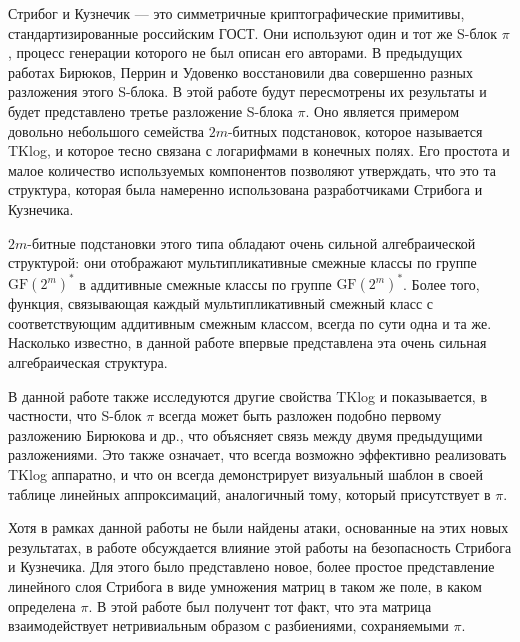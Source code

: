 \abstract

Стрибог и Кузнечик — это симметричные криптографические примитивы, стандартизированные российским ГОСТ. Они используют один и тот же S-блок \(\pi\), процесс генерации которого не был описан его авторами. В предыдущих работах Бирюков, Перрин и Удовенко восстановили два совершенно разных разложения этого S-блока. В этой работе будут пересмотрены их результаты и будет представлено третье разложение S-блока \(\pi\). Оно является примером довольно небольшого семейства \(2m\)-битных подстановок, которое называется TKlog, и которое тесно связана с логарифмами в конечных полях. Его простота и малое количество используемых компонентов позволяют утверждать, что это та структура, которая была намеренно использована разработчиками Стрибога и Кузнечика.

\(2m\)-битные подстановки этого типа обладают очень сильной алгебраической структурой: они отображают мультипликативные смежные классы по группе \(\text{GF}(2^m)^*\) в аддитивные смежные классы по группе \(\text{GF}(2^m)^*\). Более того, функция, связывающая каждый мультипликативный смежный класс с соответствующим аддитивным смежным классом, всегда по сути одна и та же. Насколько известно, в данной работе впервые представлена эта очень сильная алгебраическая структура.

В данной работе также исследуются другие свойства TKlog и показывается, в частности, что S-блок \(\pi\) всегда может быть разложен подобно первому разложению Бирюкова и др., что объясняет связь между двумя предыдущими разложениями. Это также означает, что всегда возможно эффективно реализовать TKlog аппаратно, и что он всегда демонстрирует визуальный шаблон в своей таблице линейных аппроксимаций, аналогичный тому, который присутствует в \(\pi\).

Хотя в рамках данной работы не были найдены атаки, основанные на этих новых результатах, в работе обсуждается влияние этой работы на безопасность Стрибога и Кузнечика. Для этого было представлено новое, более простое представление линейного слоя Стрибога в виде умножения матриц в таком же поле, в каком определена \(\pi\). В этой работе был получент тот факт, что эта матрица взаимодействует нетривиальным образом с разбиениями, сохраняемыми \(\pi\).
